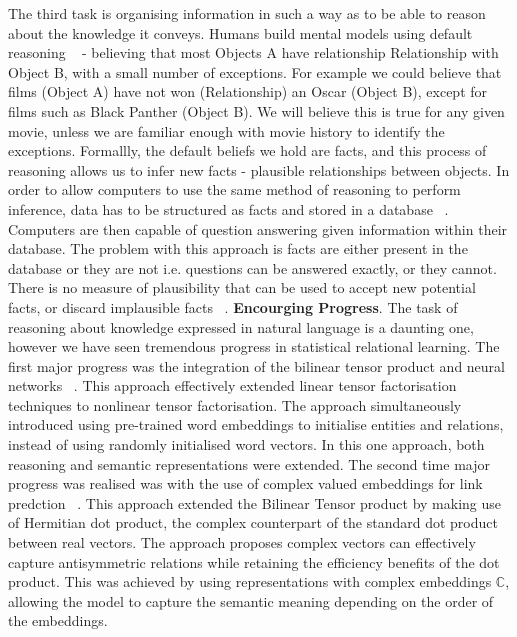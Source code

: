The third task is organising information in such a way as to be able to reason about the knowledge it conveys. Humans build mental models using default reasoning ~\citep{reiter1980logic} - believing that most Objects A have relationship Relationship with Object B, with a small number of exceptions. For example we could believe that films (Object A) have not won (Relationship) an Oscar (Object B), except for films such as Black Panther (Object B). We will believe this is true for any given movie, unless we are familiar enough with movie history to identify the exceptions. Formallly, the default beliefs we hold are facts, and this process of reasoning allows us to infer new facts - plausible relationships between objects. In order to allow computers to use the same method of reasoning to perform inference, data has to be structured as facts and stored in a database ~\citep{angeli2013philosophers}. Computers are then capable of question answering given information within their database. The problem with this approach is facts are either present in the database or they are not i.e. questions can be answered exactly, or they cannot. There is no measure of plausibility that can be used to accept new potential facts, or discard implausible facts ~\citep{koller2007introduction}. \newline
\textbf{Encourging Progress}. The task of reasoning about knowledge expressed in natural language is a daunting one, however we have seen tremendous progress in statistical relational learning. The first major progress was the integration of the bilinear tensor product and neural networks ~\citep{socher2013reasoning}. This approach effectively extended linear tensor factorisation techniques to nonlinear tensor factorisation. The approach simultaneously introduced using pre-trained word embeddings to initialise entities and relations, instead of using randomly initialised word vectors. In this one approach, both reasoning and semantic representations were extended. \newline
The second time major progress was realised was with the use of complex valued embeddings for link predction ~\citep{trouillon2016complex}. This approach extended the Bilinear Tensor product by making use of Hermitian dot product, the complex counterpart of the standard dot product between real vectors. The approach proposes complex vectors can effectively capture antisymmetric relations while retaining the efficiency benefits of the dot product. This was achieved by using representations with complex embeddings $\mathbb{C}$, allowing the model to capture the semantic meaning depending on the order of the embeddings. \newline 
